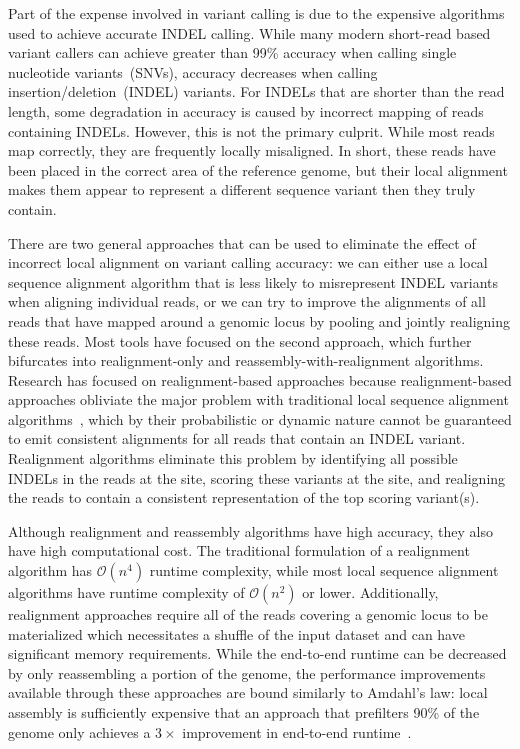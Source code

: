 \documentclass{bioinfo}
\begin{document}
Part of the expense involved in variant calling is due to the expensive algorithms
used to achieve accurate INDEL calling.
While many modern short-read based variant callers can achieve greater than
99\% accuracy when calling single nucleotide variants~(SNVs), accuracy decreases
when calling insertion/deletion~(INDEL) variants. For INDELs that are shorter
than the read length, some degradation in accuracy is caused by incorrect
mapping of reads containing INDELs. However, this is not the primary culprit.
While most reads map correctly, they
are frequently locally misaligned. In short, these reads have been placed in
the correct area of the reference genome, but their local alignment makes them
appear to represent a different sequence variant then they truly contain.

There are two general approaches that can be used to eliminate the effect of
incorrect local alignment on variant calling accuracy: we can either use a local
sequence alignment algorithm that is less likely to misrepresent INDEL variants
when aligning individual reads, or we can try to improve the alignments of all
reads that have mapped around a genomic locus by pooling and jointly realigning
these reads. Most tools have focused on the second approach, which further
bifurcates into realignment-only and reassembly-with-realignment algorithms.
Research has focused on realignment-based approaches because realignment-based
approaches obliviate the major problem with traditional local sequence alignment
algorithms~\citep{smith81, ukkonen85, landau86}, which by their probabilistic or
dynamic nature cannot be guaranteed to emit consistent alignments for all reads
that contain an INDEL variant. Realignment algorithms eliminate
this problem by identifying all possible INDELs in the reads at the site,
scoring these variants at the site, and realigning the reads to contain a
consistent representation of the top scoring variant(s).

Although realignment and reassembly algorithms have high accuracy, they also
have high computational cost. The traditional formulation of a realignment
algorithm has $\mathcal{O}(n^4)$ runtime complexity, while most local sequence
alignment algorithms have runtime complexity of $\mathcal{O}(n^2)$ or lower.
Additionally, realignment approaches require all of the reads covering a
genomic locus to be materialized which necessitates a shuffle of the input
dataset and can have significant memory requirements. While the end-to-end
runtime can be decreased by only reassembling a portion of the genome, the
performance improvements available through these approaches are bound similarly
to Amdahl's law: local assembly is sufficiently expensive that an approach that
prefilters 90\% of the genome only achieves a $3\times$ improvement in
end-to-end runtime~\citep{bloniarz14}.
\end{document}
